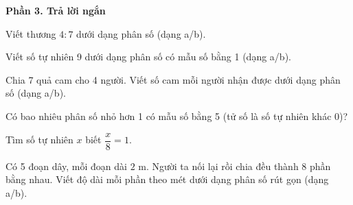 \textbf{Phần 3. Trả lời ngắn}

\begin{ex} %
Viết thương $4 : 7$ dưới dạng phân số (dạng a/b).
\end{ex}

\begin{ex} %
Viết số tự nhiên 9 dưới dạng phân số có mẫu số bằng 1 (dạng a/b).
\end{ex}

\begin{ex} %
Chia 7 quả cam cho 4 người. Viết số cam mỗi người nhận được dưới dạng phân số (dạng a/b).
\end{ex}

\begin{ex} %
Có bao nhiêu phân số nhỏ hơn 1 có mẫu số bằng 5 (tử số là số tự nhiên khác 0)?
\end{ex}

\begin{ex} %
Tìm số tự nhiên $x$ biết $\dfrac{x}{8} = 1$.
\end{ex}

\begin{ex} %
Có 5 đoạn dây, mỗi đoạn dài $2\text{ m}$. Người ta nối lại rồi chia đều thành 8 phần bằng nhau. Viết độ dài mỗi phần theo mét dưới dạng phân số rút gọn (dạng a/b).
\end{ex}
